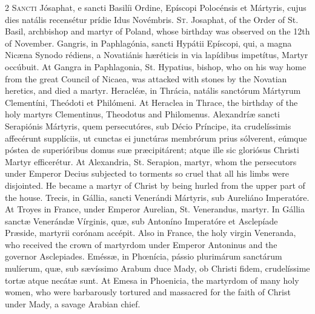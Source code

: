 \begin{paracol}{2}
\lettrine[lines=2]{S}{ancti} Jósaphat, e 
 sancti Basilíi Ordine, Epíscopi Polocénsis et Mártyris, cujus dies natális 
 recensétur prídie Idus Novémbris.
\switchcolumn
{}
\lettrine[lines=2]{S}{t.} Josaphat, of the Order of St. 
 Basil, archbishop and martyr of Poland, whose birthday was observed on the 
 12th of November.
\switchcolumn*
{}
Gangris, in Paphlagónia, 
 sancti Hypátii Epíscopi, qui, a magna Nicæna Synodo rédiens, a Novatiánis 
 hæréticis in via lapídibus impetítus, Martyr occúbuit.
\switchcolumn
{}
At Gangra in Paphlagonia, St. 
 Hypatius, bishop, who on his way home from the great Council of Nicaea, was 
 attacked with stones by the Novatian heretics, and died a martyr.
\switchcolumn*
{}
Heracléæ, in Thrácia, 
 natális sanctórum Mártyrum Clementíni, Theódoti et Philómeni.
\switchcolumn
{}
At Heraclea in Thrace, the birthday 
 of the holy martyrs Clementinus, Theodotus and Philomenus.
\switchcolumn*
{}
Alexandríæ sancti 
 Serapiónis Mártyris, quem persecutóres, sub Décio Príncipe, ita 
 crudelíssimis affecérunt supplíciis, ut cunctas ei junctúras membrórum prius 
 sólverent, eúmque póstea de superióribus domus suæ præcipitárent; atque ille 
 sic gloriósus Christi Martyr efficerétur.
\switchcolumn
{}
At Alexandria, St. Serapion, martyr, 
 whom the persecutors under Emperor Decius subjected to torments so cruel 
 that all his limbs were disjointed. He became a martyr of Christ by 
 being hurled from the upper part of the house.
\switchcolumn*
{}
Trecis, in Gállia, 
 sancti Venerándi Mártyris, sub Aureliáno Imperatóre.
\switchcolumn
{}
At Troyes in France, under Emperor 
 Aurelian, St. Venerandus, martyr.
\switchcolumn*
{}
In Gállia sanctæ 
 Venerándæ Vírginis, quæ, sub Antoníno Imperatóre et Asclepíade Præside, 
 martyrii corónam accépit.
\switchcolumn
{}
Also in France, the holy virgin 
 Veneranda, who received the crown of martyrdom under Emperor Antoninus and 
 the governor Asclepiades.
\switchcolumn*
{}
Eméssæ, in Phœnícia, 
 pássio plurimárum sanctárum mulíerum, quæ, sub sævíssimo Arabum duce Mady, 
 ob Christi fidem, crudelíssime tortæ atque necátæ sunt.
\switchcolumn
{}
At Emesa in Phoenicia, the martyrdom 
 of many holy women, who were barbarously tortured and massacred for the 
 faith of Christ under Mady, a savage Arabian chief.

\end{paracol}
